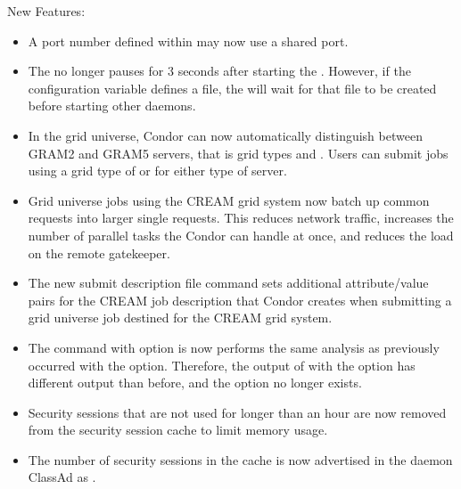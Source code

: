\noindent New Features:

\begin{itemize}

\item A port number defined within  may now use 
  a shared port.

\item The  no longer pauses for 3 seconds after starting
  the .  However, if the configuration variable
   defines a file, 
  the  will wait for that file to be created
  before starting other daemons.

\item In the grid universe, Condor can now automatically distinguish
between GRAM2 and GRAM5 servers, that is grid types  and
.
Users can submit jobs using a grid type of  or 
for either type of server.

\item Grid universe jobs using the CREAM grid system now batch up
common requests into larger single requests.  This
reduces network traffic, increases the number of parallel tasks
the Condor can handle at once, and reduces the load on the remote
gatekeeper.

\item The new submit description file command 
sets additional attribute/value pairs for the CREAM job description
that Condor creates when submitting a grid universe job 
destined for the CREAM grid system.

\item The  command with option  is now performs
the same analysis as previously occurred with the  option.
Therefore, the output of  with the  option
has different output than before,
and the  option no longer exists.

\item Security sessions that are not used for longer than an hour are
now removed from the security session cache to limit memory usage.

\item The number of security sessions in the cache is now advertised in
the daemon ClassAd as .


\end{itemize}
